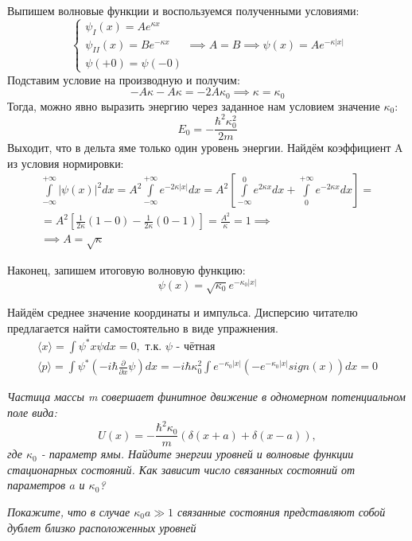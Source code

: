 Выпишем волновые функции и воспользуемся полученными условиями:
\[
\begin{cases}
    \psi_I(x) = Ae^{\kappa x}\\
    \psi_{II}(x) = Be^{-\kappa x}\\
    \psi(+0) = \psi(-0)
\end{cases}
\implies A = B \implies \psi(x) = Ae^{-\kappa|x|}
\]
Подставим условие на производную и получим:
\[
-A\kappa - A\kappa = -2A\kappa_0 \implies \kappa = \kappa_0 
\]
Тогда, можно явно выразить энергию через заданное нам условием значение $\kappa_0$:
\[
E_0 = - \frac{\hbar^2 \kappa_0^2}{2m}
\]
Выходит, что в дельта яме только один уровень энергии. Найдём коэффициент A из условия нормировки:
\begin{gather*}
\int\limits_{-\infty}^{+\infty} |\psi(x)|^2 dx = A^2 \int\limits_{-\infty}^{+\infty} e^{-2\kappa |x|} dx = A^2 \left[\int\limits_{-\infty}^0 e^{2\kappa x} dx + \int\limits_0^{+\infty} e^{-2\kappa x} dx \right] =\\
= A^2\left[ \frac{1}{2\kappa}(1 - 0) - \frac{1}{2\kappa}(0-1)\right] = \frac{A^2}{\kappa} = 1 \implies  \\ \implies  A = \sqrt{\kappa}
\end{gather*}


Наконец, запишем итоговую волновую функцию:
\[
\psi(x) = \sqrt{\kappa_0}e^{-\kappa_0 |x|}
\]

Найдём среднее значение координаты и импульса. Дисперсию читателю предлагается найти самостоятельно в виде упражнения.
\begin{gather*}
    \langle x \rangle = \int\psi^*x\psi dx = 0, \text{ т.к. $\psi$ - чётная} \\
    \langle p \rangle = \int\psi^*(-i\hbar\frac{\partial}{\partial x}\psi) dx = -i\hbar\kappa_0^2\int e^{-\kappa_0|x|}(-e^{-\kappa_0|x|} sign (x)) dx = 0
\end{gather*}
\begin{center}
    \textit{Частица массы m совершает финитное движение в одномерном потенциальном поле вида:}
    \[
    U(x) = -\frac{\hbar^2\kappa_0}{m}(\delta(x+a) + \delta(x-a)),
    \]
    \textit{где $\kappa_0$ - параметр ямы. Найдите энергии уровней и волновые функции стационарных состояний. Как зависит число связанных состояний от параметров $a$ и $\kappa_0$?}
    
    \textit{Покажите, что в случае $\kappa_0a \gg 1$ связанные состояния представляют собой дублет близко расположенных уровней}
\end{center}

